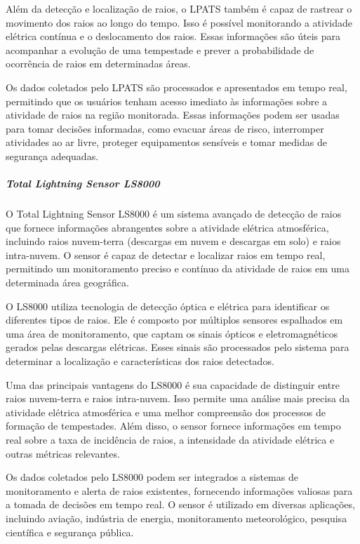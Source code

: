 \documentclass[a4paper, 12pt, onecolumn,singlespacing]{article}
\begin{document}
	Além da detecção e localização de raios, o LPATS também é capaz de rastrear o movimento dos raios ao longo do tempo. Isso é possível monitorando a atividade elétrica contínua e o deslocamento dos raios. Essas informações são úteis para acompanhar a evolução de uma tempestade e prever a probabilidade de ocorrência de raios em determinadas áreas.
	
	Os dados coletados pelo LPATS são processados e apresentados em tempo real, permitindo que os usuários tenham acesso imediato às informações sobre a atividade de raios na região monitorada. Essas informações podem ser usadas para tomar decisões informadas, como evacuar áreas de risco, interromper atividades ao ar livre, proteger equipamentos sensíveis e tomar medidas de segurança adequadas.
	
	\subparagraph{Total Lightning Sensor LS8000}
	
	O Total Lightning Sensor LS8000 é um sistema avançado de detecção de raios que fornece informações abrangentes sobre a atividade elétrica atmosférica, incluindo raios nuvem-terra (descargas em nuvem e descargas em solo) e raios intra-nuvem. O sensor é capaz de detectar e localizar raios em tempo real, permitindo um monitoramento preciso e contínuo da atividade de raios em uma determinada área geográfica.
	
	O LS8000 utiliza tecnologia de detecção óptica e elétrica para identificar os diferentes tipos de raios. Ele é composto por múltiplos sensores espalhados em uma área de monitoramento, que captam os sinais ópticos e eletromagnéticos gerados pelas descargas elétricas. Esses sinais são processados pelo sistema para determinar a localização e características dos raios detectados.
	
	Uma das principais vantagens do LS8000 é sua capacidade de distinguir entre raios nuvem-terra e raios intra-nuvem. Isso permite uma análise mais precisa da atividade elétrica atmosférica e uma melhor compreensão dos processos de formação de tempestades. Além disso, o sensor fornece informações em tempo real sobre a taxa de incidência de raios, a intensidade da atividade elétrica e outras métricas relevantes.
	
	Os dados coletados pelo LS8000 podem ser integrados a sistemas de monitoramento e alerta de raios existentes, fornecendo informações valiosas para a tomada de decisões em tempo real. O sensor é utilizado em diversas aplicações, incluindo aviação, indústria de energia, monitoramento meteorológico, pesquisa científica e segurança pública.
	
	
\end{document}
